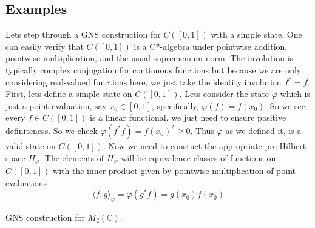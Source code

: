 \subsection{Examples}
\begin{example}
Lets step through a GNS construction for \( C([0,1]) \) with a simple state. One
can easily verify that $C([0,1])$ is a C*-algebra under pointwise addition, pointwise
multiplication, and the usual suprememum norm. The involution is typically complex
conjugation for continuous functions but because we are only considering real-valued
functions here, we just take the identity involution $f^*=f$. First, lets define a simple state
on $C([0,1])$. Lets consider the state $\varphi$ which is just a point evaluation,
say $x_0 \in [0,1]$, specifically, $\varphi(f) = f(x_0)$. So we see every $f \in C([0,1])$
is a linear functional, we just need to ensure positive definiteness. So we check
$\varphi(f^*f) = f(x_0)^2 \ge 0$. Thus $\varphi$ as we defined it, is a valid state
on $C([0,1])$. Now we need to constuct the appropriate pre-Hilbert space $H_\varphi$.
The elements of $H_\varphi$ will be equivalence classes of functions on $C([0,1])$
with the inner-product given by pointwise multiplication of point evaluations
\begin{equation*}
    \langle f,g \rangle_\varphi = \varphi(g^*f) = g(x_0)f(x_0)
\end{equation*}
\end{example}
\begin{example}
GNS construction for \( M_2(\mathbb{C}) \).
\end{example}